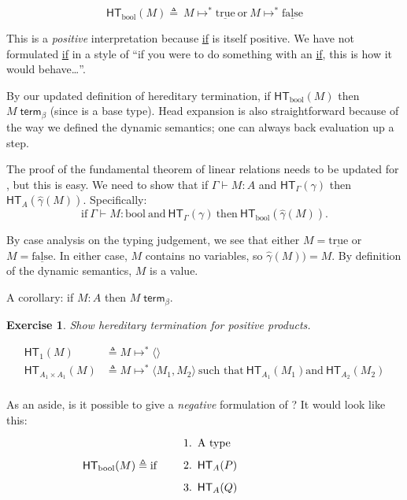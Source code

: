 \documentclass{article}
\newtheorem{exercise}[thm]{Exercise}
\newcommand{\hasEF}[3]{\ensuremath{#1 \vdash #2 : #3}}
\newcommand{\hterm}[2]{\ensuremath{\mathsf{HT}_{#1}(#2)}}
\newcommand{\termb}[1]{\ensuremath{{#1} \; \mathsf{term}_{\beta}}}
\newcommand{\steps}[2]{\ensuremath{#1 \mapsto^* #2}}
\newcommand{\emptypair}{\ensuremath{\langle \rangle}}
\newcommand{\exprpair}[2]{\ensuremath{\langle #1, #2\rangle}}
\newcommand{\pairtype}[2]{\ensuremath{#1 \times #2}}
\newcommand{\booltype}{\text{bool}}
\newcommand{\unittype}{1}
\newcommand{\true}{\ensuremath{\mathrm{\underline{true}}}}
\newcommand{\false}{\ensuremath{\mathrm{\underline{false}}}}
\begin{document}
\[
\hterm{\booltype}{M} \triangleq \ \steps{M}{\true} \ \text{or} \ \steps{M}{\false}
\]


This is a \textit{positive} interpretation because \underline{if} is itself positive. We have not formulated \underline{if} in a style of ``if you were to do something with an \underline{if}, this is how it would behave\ldots''.

By our updated definition of hereditary termination, if \hterm{\booltype}{M} then \termb{M} (since \booltype{} is a base type). Head expansion is also straightforward because of the way we defined the dynamic semantics; one can always back evaluation up a step.

The proof of the fundamental theorem of linear relations needs to be updated for \booltype, but this is easy. We need to show that if \hasEF{\Gamma}{M}{A} and \hterm{\Gamma}{\gamma} then \hterm{A}{\hat\gamma(M)}. Specifically:
\[
\text{if} \ \hasEF{\Gamma}{M}{\booltype}  \ \text{and} \  \hterm{\Gamma}{\gamma} \ \text{then} \  \hterm{\booltype}{\hat\gamma(M)}.
\]

By case analysis on the typing judgement, we see that either $M = \true$ or $M = \false$. In either case, $M$ contains no variables, so $\hat\gamma(M)) = M$. By definition of the dynamic semantics, $M$ is a value.

A corollary: if $M : A$ then \termb{M}.

\begin{exercise}
Show hereditary termination for positive products.

\begin{align*}
\hterm{\unittype}{M} &\triangleq \steps{M}{\emptypair}\\
\hterm{\pairtype{A_1}{A_1}}{M} &\triangleq \steps{M}{\exprpair{M_1}{M_2}} \ \text{such that} \  \hterm{A_1}{M_1} \text{and} \  \hterm{A_2}{M_2}\\
\end{align*}
\end{exercise} 

As an aside, is it possible to give a \textit{negative} formulation of \booltype? It would look like this:

\[
\hterm{\booltype}{M} \triangleq \text{if} \hspace{12pt} \begin{minipage}{5cm}
	\begin{enumerate}
	\item A type
	\item \hterm{A}{P}
	\item \hterm{A}{Q}
	\end{enumerate}
\end{minipage}\\
\]
\end{document}
